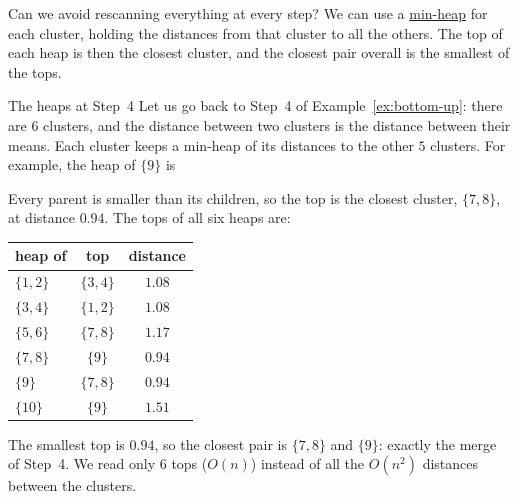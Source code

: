 \documentclass[a4paper,12pt,oneside]{report}
\begin{document}
Can we avoid rescanning everything at every step? We can use a
\hyperref[def:binary-min-heap]{min-heap} for each cluster,
holding the distances from that cluster to all the others. The top of
each heap is then the closest cluster, and the closest pair overall is
the smallest of the tops.

\begin{framedexample}{The heaps at Step~4}\label{ex:cluster-heaps}
Let us go back to Step~4 of Example~\ref{ex:bottom-up}: there are $6$
clusters, and the distance between two clusters is the distance between
their means. Each cluster keeps a min-heap of its distances to the
other $5$ clusters. For example, the heap of $\{9\}$ is
\begin{center}
\end{center}
Every parent is smaller than its children, so the top is the closest
cluster, $\{7,8\}$, at distance $0.94$. The tops of all six heaps are:
\begin{center}
\renewcommand{\arraystretch}{1.15}
\begin{tabular}{lcc}
  heap of & top & distance\\\hline
  $\{1,2\}$ & $\{3,4\}$ & $1.08$\\
  $\{3,4\}$ & $\{1,2\}$ & $1.08$\\
  $\{5,6\}$ & $\{7,8\}$ & $1.17$\\
  $\{7,8\}$ & $\{9\}$ & $\mathbf{0.94}$\\
  $\{9\}$ & $\{7,8\}$ & $\mathbf{0.94}$\\
  $\{10\}$ & $\{9\}$ & $1.51$
\end{tabular}
\end{center}
The smallest top is $0.94$, so the closest pair is $\{7,8\}$ and
$\{9\}$: exactly the merge of Step~4. We read only $6$ tops ($O(n)$)
instead of all the $O(n^2)$ distances between the clusters.
\end{framedexample}
\end{document}
